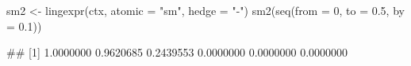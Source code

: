 \begin{Schunk}
% --begin: "emptyhedge2"
\begin{Sinput}
sm2 <- lingexpr(ctx, atomic = "sm", hedge = "-")
sm2(seq(from = 0, to = 0.5, by = 0.1))
\end{Sinput}
\begin{Soutput}
## [1] 1.0000000 0.9620685 0.2439553 0.0000000 0.0000000 0.0000000
\end{Soutput}
%
% --end: "emptyhedge2"
\end{Schunk}
